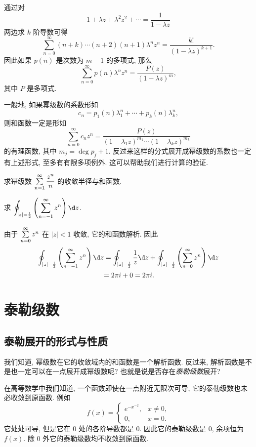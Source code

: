 通过对
\[1+\lambda z+\lambda^2 z^2+\cdots=\dfrac1{1-\lambda z}\]
两边求 $k$ 阶导数可得
\[\sum_{n=0}^{\infty}(n+k)\cdots(n+2)(n+1)\lambda^n z^n=\frac{k!}{(1-\lambda z)^{k+1}}.\]
因此如果 $p(n)$ 是次数为 $m-1$ 的多项式, 那么
\[\sum_{n=0}^\infty p(n)\lambda^n z^n=\frac{P(z)}{(1-\lambda z)^{m}},\]
其中 $P$ 是多项式.

一般地, 如果幂级数的系数形如
\[c_n=p_1(n)\lambda_1^n+\cdots+p_k(n)\lambda_k^n,\]
则和函数一定是形如
\[\sum_{n=0}^{\infty}c_nz^n
=\frac{P(z)}{(1-\lambda_1z)^{m_1}\cdots(1-\lambda_kz)^{m_k}}\]
的有理函数,	其中 $m_j=\deg p_j+1$.
反过来这样的分式展开成幂级数的系数也一定有上述形式, 至多有有限多项例外.
这可以帮助我们进行计算的验证.
\begin{exercise}
	求幂级数 $\sum\limits_{n=1}^\infty\dfrac{z^n}n$ 的收敛半径与和函数.
\end{exercise}

\begin{example}
	求 $\displaystyle\oint_{|z|=\half }\left(\sum_{n=-1}^\infty z^n\right)\d z$.
\end{example}

\begin{solution}
	由于 $\sum\limits_{n=0}^\infty z^n$ 在 $|z|<1$ 收敛,
{它的和函数解析.
}{因此
	\begin{align*}
	\oint_{|z|=\half }\left(\sum_{n=-1}^\infty z^n\right)\d z
	&=\oint_{|z|=\half }\frac1z\d z+\oint_{|z|=\half }\left(\sum_{n=0}^\infty z^n\right)\d z\\
	&{=2\pi i+0=2\pi i.}
\end{align*}}
\end{solution}

\section{泰勒级数}

\subsection{泰勒展开的形式与性质}

我们知道, 幂级数在它的收敛域内的和函数是一个解析函数.
反过来, 解析函数是不是也一定可以在一点展开成幂级数呢? 也就是说是否存在\emph{泰勒级数}展开?

在高等数学中我们知道, 一个函数即使在一点附近无限次可导, 它的泰勒级数也未必收敛到原函数.
例如
\[f(x)=\begin{cases}
e^{-x^{-2}},&x\neq 0,\\
0,&x=0.\end{cases}\]
它处处可导, 但是它在 $0$ 处的各阶导数都是 $0$.
因此它的泰勒级数是 $0$, 余项恒为 $f(x)$.
除 $0$ 外它的泰勒级数均不收敛到原函数.

